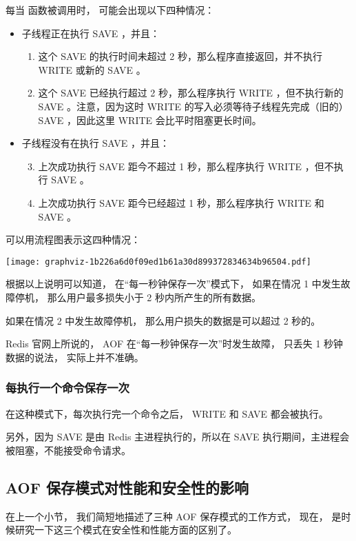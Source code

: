 \documentclass[a4paper,11pt,english]{sphinxmanual}
\begin{document}
每当  函数被调用时，
可能会出现以下四种情况：
\begin{itemize}
\item {} 
子线程正在执行 SAVE ，并且：
\begin{enumerate}
\item {} 
这个 SAVE 的执行时间未超过 2 秒，那么程序直接返回，并不执行 WRITE 或新的 SAVE 。

\item {} 
这个 SAVE 已经执行超过 2 秒，那么程序执行 WRITE ，但不执行新的 SAVE 。注意，因为这时 WRITE 的写入必须等待子线程先完成（旧的） SAVE ，因此这里 WRITE 会比平时阻塞更长时间。

\end{enumerate}

\item {} 
子线程没有在执行 SAVE ，并且：
\begin{enumerate}
\setcounter{enumi}{2}
\item {} 
上次成功执行 SAVE 距今不超过 1 秒，那么程序执行 WRITE ，但不执行 SAVE 。

\item {} 
上次成功执行 SAVE 距今已经超过 1 秒，那么程序执行 WRITE 和 SAVE 。

\end{enumerate}

\end{itemize}

可以用流程图表示这四种情况：

\texttt{[image: graphviz-1b226a6d0f09ed1b61a30d899372834634b96504.pdf]}

根据以上说明可以知道，
在“每一秒钟保存一次”模式下，
如果在情况 1 中发生故障停机，
那么用户最多损失小于 2 秒内所产生的所有数据。

如果在情况 2 中发生故障停机，
那么用户损失的数据是可以超过 2 秒的。

Redis 官网上所说的，
AOF 在“每一秒钟保存一次”时发生故障，
只丢失 1 秒钟数据的说法，
实际上并不准确。


\subsubsection{每执行一个命令保存一次}
\label{internal/aof:id8}
在这种模式下，每次执行完一个命令之后， WRITE 和 SAVE 都会被执行。

另外，因为 SAVE 是由 Redis 主进程执行的，所以在 SAVE 执行期间，主进程会被阻塞，不能接受命令请求。


\subsection{AOF 保存模式对性能和安全性的影响}
\label{internal/aof:id9}
在上一个小节，
我们简短地描述了三种 AOF 保存模式的工作方式，
现在，
是时候研究一下这三个模式在安全性和性能方面的区别了。
\end{document}
